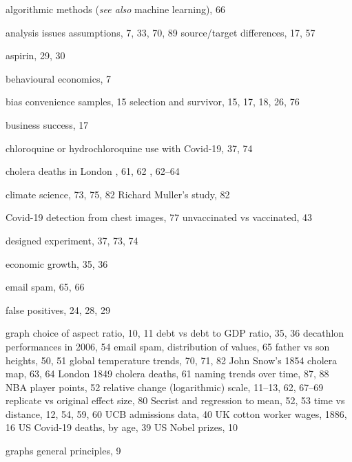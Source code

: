 \documentclass[
  10pt,
  b5paper]{book}
\begin{document}
\begin{theindex}

  \item algorithmic methods (\textit{see also} machine learning), 66
  \item analysis issues
    \subitem assumptions, 7, 33, 70, 89
    \subitem source/target differences, 17, 57
  \item aspirin, 29, 30

  \indexspace

  \item behavioural economics, 7
  \item bias
    \subitem convenience samples, 15
    \subitem selection and survivor, 15, 17, 18, 26, 76
  \item business success, 17

  \indexspace

  \item chloroquine or hydrochloroquine
    \subitem use with Covid-19, 37, 74
  \item cholera deaths in London
    , 61, 62
    , 62--64
  \item climate science, 73, 75, 82
    \subitem Richard Muller's study, 82
  \item Covid-19
    \subitem detection from chest images, 77
    \subitem unvaccinated vs vaccinated, 43

  \indexspace

  \item designed experiment, 37, 73, 74

  \indexspace

  \item economic growth, 35, 36
  \item email spam, 65, 66

  \indexspace

  \item false positives, 24, 28, 29

  \indexspace

  \item graph
    \subitem choice of aspect ratio, 10, 11
    \subitem debt vs debt to GDP ratio, 35, 36
    \subitem decathlon performances in 2006, 54
    \subitem email spam, distribution of values, 65
    \subitem father vs son heights, 50, 51
    \subitem global temperature trends, 70, 71, 82
    \subitem John Snow's 1854 cholera map, 63, 64
    \subitem London 1849 cholera deaths, 61
    \subitem naming trends over time, 87, 88
    \subitem NBA player points, 52
    \subitem relative change (logarithmic) scale, 11--13, 62, 67--69
    \subitem replicate vs original effect size, 80
    \subitem Secrist and regression to mean, 52, 53
    \subitem time vs distance, 12, 54, 59, 60
    \subitem UCB admissions data, 40
    \subitem UK cotton worker wages, 1886, 16
    \subitem US Covid-19 deaths, by age, 39
    \subitem US Nobel prizes, 10
  \item graphs
    \subitem general principles, 9


\end{theindex}
\end{document}
